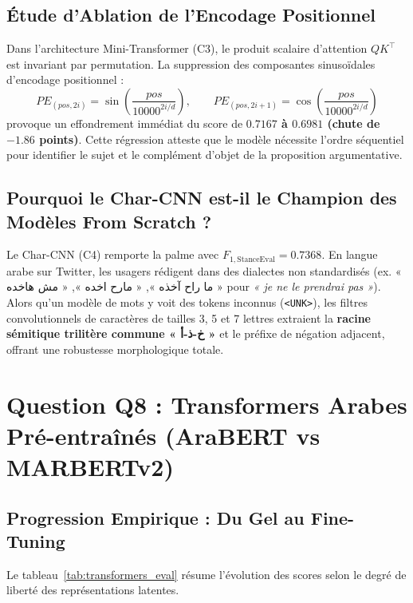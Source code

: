 \documentclass[11pt,a4paper]{article}
\begin{document}
\subsection{Étude d'Ablation de l'Encodage Positionnel}
Dans l'architecture Mini-Transformer (C3), le produit scalaire d'attention $QK^\top$ est invariant par permutation. La suppression des composantes sinusoïdales d'encodage positionnel :
\begin{equation}
    PE_{(pos, 2i)} = \sin\left(\frac{pos}{10000^{2i/d}}\right), \qquad PE_{(pos, 2i+1)} = \cos\left(\frac{pos}{10000^{2i/d}}\right)
\end{equation}
provoque un effondrement immédiat du score de \textbf{$0.7167$ à $0.6981$ (chute de $-1.86$ points)}. Cette régression atteste que le modèle nécessite l'ordre séquentiel pour identifier le sujet et le complément d'objet de la proposition argumentative.

\subsection{Pourquoi le Char-CNN est-il le Champion des Modèles From Scratch ?}
Le Char-CNN (C4) remporte la palme avec $F_{1,\text{StanceEval}} = \mathbf{0.7368}$. En langue arabe sur Twitter, les usagers rédigent dans des dialectes non standardisés (ex. « ما راح آخذه », « مارح اخده », « مش هاخده » pour \textit{« je ne le prendrai pas »}). Alors qu'un modèle de mots y voit des tokens inconnus (\texttt{<UNK>}), les filtres convolutionnels de caractères de tailles 3, 5 et 7 lettres extraient la \textbf{racine sémitique trilitère commune « خ-ذ-أ »} et le préfixe de négation adjacent, offrant une robustesse morphologique totale.

\section{Question Q8 : Transformers Arabes Pré-entraînés (AraBERT vs MARBERTv2)}

\subsection{Progression Empirique : Du Gel au Fine-Tuning}
Le tableau~\ref{tab:transformers_eval} résume l'évolution des scores selon le degré de liberté des représentations latentes.
\end{document}
